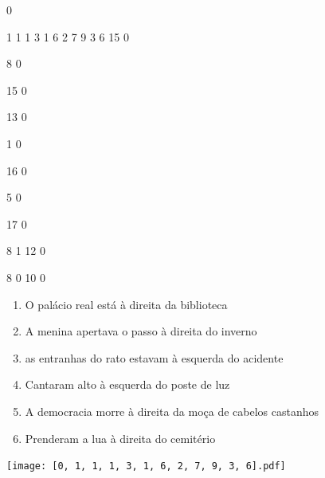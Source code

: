 \documentclass[12pt]{article}
\begin{document}
		\vfill  
		  
{
	0	%

	1	%
	1	%
	1	%
	3	%
	1	%
	6	%
	2	%
	7	%
	9	%
	3	%
	6	%
	15	%
	0	%

	8	%
	0	%

	15	%
	0	%

	13	%
	0	%

	1	%
	0	%

	16	%
	0	%

	5	%
	0	%

	17	%
	0	%

	8	%
	1	%
	12	%
	0	%

	8	%
	0	%
	10	%
	0	%

}	  
		    	

		 

\pagebreak


	\begin{enumerate}
		  \sffamily %
		  \large %


\vfill \item
O palácio real está	%
à direita
da biblioteca	%

\vfill \item
A menina apertava o passo	%
à direita
do inverno	%

\vfill \item
as entranhas do rato estavam	%
à esquerda
do acidente	%

\vfill \item
Cantaram alto	%
à esquerda
do poste de luz	%

\vfill \item
A democracia morre	%
à direita
da moça de cabelos castanhos	%

\vfill \item
Prenderam a lua	%
à direita
do cemitério	%
	\end{enumerate}
		  
		  \hfill

		  \vfill

\texttt{[image: [0, 1, 1, 1, 3, 1, 6, 2, 7, 9, 3, 6].pdf]}


	\hfill	  	  

\end{document}
